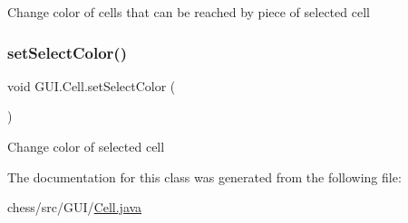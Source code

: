 Change color of cells that can be reached by piece of selected cell \mbox{\label{class_g_u_i_1_1_cell_a1cf4a36fc527ce7e2167723d7dc0858b}} 
\subsubsection{\texorpdfstring{setSelectColor()}{setSelectColor()}}
{\footnotesize\ttfamily void G\+U\+I.\+Cell.\+set\+Select\+Color (\begin{DoxyParamCaption}{ }\end{DoxyParamCaption})\hspace{0.3cm}{\ttfamily [inline]}}

Change color of selected cell 

The documentation for this class was generated from the following file\+:\begin{DoxyCompactItemize}
\item 
chess/src/\+G\+U\+I/\mbox{\hyperlink{_cell_8java}{Cell.\+java}}\end{DoxyCompactItemize}
